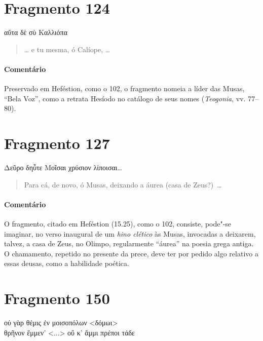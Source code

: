 \section{Fragmento 124}

\begin{gkverse}
αὔτα δὲ σὺ Καλλιόπα
\end{gkverse}

\begin{verse}
\ldots{} e tu mesma, ó Calíope, \ldots{}
\end{verse}

{\paragraph{Comentário} Preservado em Heféstion, como o 102, o fragmento nomeia a líder das Musas, ``Bela Voz'', como a retrata Hesíodo no catálogo de seus nomes (\textit{Teogonia}, vv. 77--80).}



\pagebreak
\section{Fragmento 127}

\begin{gkverse}
Δεῦρο δηὖτε Μοῖσαι χρύσιον λίποισαι\ldots{}
\end{gkverse}

\begin{verse}
Para cá, de novo, ó Musas, deixando a áurea (casa de \mbox{Zeus?) \ldots{}}
\end{verse}

{\paragraph{Comentário} O fragmento, citado em Heféstion (15.25), como o 102, consiste, pode"-se imaginar, no
verso inaugural de um \textit{hino clético }às Musas, invocadas a deixarem,
talvez, a casa de Zeus, no Olimpo, regularmente ``áurea''
na poesia grega antiga. O chamamento, repetido no presente da prece, deve ter
por pedido algo relativo a essas deusas, como a habilidade poética.}

\pagebreak
\section{Fragmento 150}

\begin{gkverse}
οὐ γὰρ θέμις ἐν μοισοπόλων <δόμωι>\\
θρῆνον ἔμμεν’ <...> οὔ κ’ ἄμμι πρέποι τάδε
\end{gkverse}

